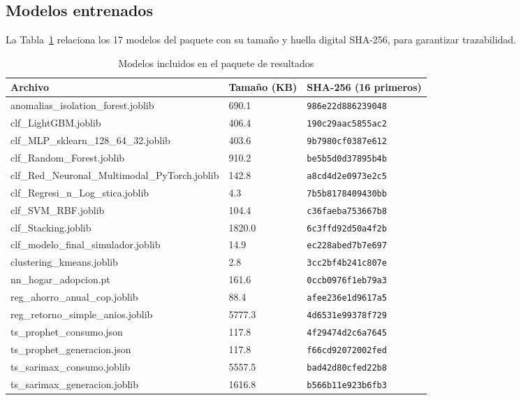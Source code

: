 \subsection{Modelos entrenados}
La Tabla~\ref{tab:modelos} relaciona los 17 modelos del paquete con su tamaño y huella digital SHA-256, para garantizar trazabilidad.
\begin{table}[p]
\caption{Modelos incluidos en el paquete de resultados}
\label{tab:modelos}
\centering\scriptsize
\begin{tabular}{@{}lll@{}}
\toprule
Archivo & Tamaño (KB) & SHA-256 (16 primeros) \\
\midrule
anomalias\_isolation\_forest.joblib & 690.1 & \texttt{986e22d886239048} \\
clf\_LightGBM.joblib & 406.4 & \texttt{190c29aac5855ac2} \\
clf\_MLP\_sklearn\_128\_64\_32.joblib & 403.6 & \texttt{9b7980cf0387e612} \\
clf\_Random\_Forest.joblib & 910.2 & \texttt{be5b5d0d37895b4b} \\
clf\_Red\_Neuronal\_Multimodal\_PyTorch.joblib & 142.8 & \texttt{a8cd4d2e0973e2c5} \\
clf\_Regresi\_n\_Log\_stica.joblib & 4.3 & \texttt{7b5b8178409430bb} \\
clf\_SVM\_RBF.joblib & 104.4 & \texttt{c36faeba753667b8} \\
clf\_Stacking.joblib & 1820.0 & \texttt{6c3ffd92d50a4f2b} \\
clf\_modelo\_final\_simulador.joblib & 14.9 & \texttt{ec228abed7b7e697} \\
clustering\_kmeans.joblib & 2.8 & \texttt{3cc2bf4b241c807e} \\
nn\_hogar\_adopcion.pt & 161.6 & \texttt{0ccb0976f1eb79a3} \\
reg\_ahorro\_anual\_cop.joblib & 88.4 & \texttt{afee236e1d9617a5} \\
reg\_retorno\_simple\_anios.joblib & 5777.3 & \texttt{4d6531e99378f729} \\
ts\_prophet\_consumo.json & 117.8 & \texttt{4f29474d2c6a7645} \\
ts\_prophet\_generacion.json & 117.8 & \texttt{f66cd92072002fed} \\
ts\_sarimax\_consumo.joblib & 5557.5 & \texttt{bad42d80cfed22b8} \\
ts\_sarimax\_generacion.joblib & 1616.8 & \texttt{b566b11e923b6fb3} \\
\bottomrule
\end{tabular}
\end{table}
